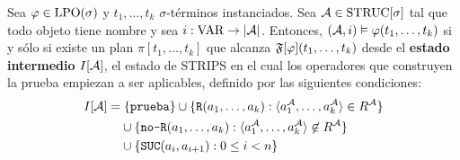 \begin{theorem}
\label{teoremaprimerorden}
Sea $\varphi \in \text{LPO}(\sigma)$ y $t_1,\ldots,t_k$ $\sigma$-términos instanciados. Sea $\mathcal{A} \in
\text{STRUC}[\sigma]$ tal que todo objeto tiene nombre y sea $i : \text{VAR} \rightarrow |\mathcal{A}|$.
Entonces, $(\mathcal{A}, i) \vDash \varphi(t_1,\ldots,t_k)$ si y sólo si
existe un plan $\pi[t_1,\ldots,t_k]$ que alcanza
$\mathfrak{F}[\varphi](t_1,\ldots,t_k)$ desde el \textbf{estado intermedio} $I[\mathcal{A}]$,
el estado de STRIPS en el cual los operadores que construyen la
prueba empiezan a ser aplicables, definido por las siguientes condiciones:
\begin{alignat*}{1}
& I[\A] = \{\texttt{prueba}\} \cup \{ \texttt{R}(a_1,\ldots,a_k) :
\tup{a_1^\A,\ldots,a_k^\A} \in R^\A\}\\
& {\color{white} I[\A] = } \cup \{\texttt{no-R}(a_1,\ldots,a_k) : \tup{a_1^\A,\ldots,a_k^\A} \not\in R^\A\}\\
& {\color{white} I[\A] = } \cup \{\texttt{SUC}(a_i, a_{i+1}) : 0 \leq i < n\}
\end{alignat*}
\end{theorem}
